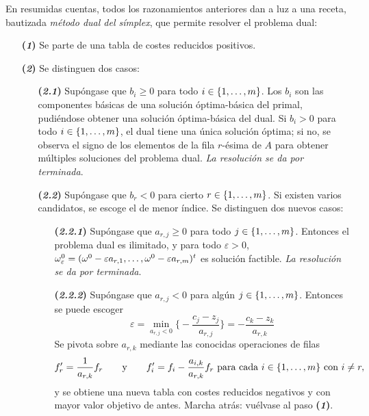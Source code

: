 \documentclass[11pt]{report}
\theoremstyle{mytheorem}
\theoremstyle{mydefinition}
\theoremstyle{myexample}
\begin{document}
En resumidas cuentas, todos los razonamientos anteriores dan a luz a una receta, bautizada {\textit{método dual del símplex}}, que permite resolver el problema dual:

\begin{itemize}
    \item[\textbf{(\textit{1})}]Se parte de una tabla de costes reducidos positivos.
    \item[\textbf{(\textit{2})}]Se distinguen dos casos:
    \begin{itemize}
        \item[\textbf{(\textit{2.1})}]Supóngase que $b_i \geq 0$ para todo $i \in \{1,\mathellipsis,m\}$. Los $b_i$ son las componentes básicas de una solución óptima-básica del primal, pudiéndose obtener una solución óptima-básica del dual. Si $b_i >0$ para todo $i \in \{1,\mathellipsis,m\}$, el dual tiene una única solución óptima; si no, se observa el signo de los elementos de la fila $r$-ésima de $A$ para obtener múltiples soluciones del problema dual. {\textit{La resolución se da por terminada}}.
        \item[\textbf{(\textit{2.2})}]Supóngase que $b_r < 0$ para cierto $r \in \{1,\mathellipsis,m\}$. Si existen varios candidatos, se escoge el de menor índice. Se distinguen dos nuevos casos:
        \begin{itemize}
            \item[\textbf{(\textit{2.2.1})}]Supóngase que $a_{r,j}\geq 0$ para todo $j \in \{1,\mathellipsis,m\}$. Entonces el problema dual es ilimitado, y para todo $\varepsilon>0$, $\omega^0_\varepsilon = (\omega^0-\varepsilon a_{r,1},\mathellipsis,\omega^0-\varepsilon a_{r,m})^t$ es solución factible. {\textit{La resolución se da por terminada}}.
            \item[\textbf{(\textit{2.2.2})}]Supóngase que $a_{r,j} < 0$ para algún $j \in \{1,\mathellipsis,m\}$. Entonces se puede escoger
            \[\varepsilon = \min_{a_{r,j} <0} \biggl\{-\frac{c_j-z_j}{a_{r,j}}\biggr\} = -\frac{c_k-z_k}{a_{r,k}}\]
            Se pivota sobre $a_{r,k}$ mediante las conocidas operaciones de filas
            \[f_r' = \frac{1}{a_{r,k}}f_r \qquad \textup{y} \qquad f_i' = f_i -\frac{a_{i,k}}{a_{r,k}}f_r \textup{ para cada } i \in \{1,\mathellipsis,m\} \textup{ con } i \neq r,\]
            y se obtiene una nueva tabla con costes reducidos negativos y con mayor valor objetivo de antes. Marcha atrás: vuélvase al paso \textbf{(\textit{1})}.
        \end{itemize}
    \end{itemize}
\end{itemize}
\end{document}

